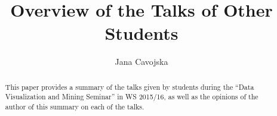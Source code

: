 \documentclass[runningheads,a4paper]{llncs}
\begin{document}


\title{Overview of the Talks of Other Students}

\author{Jana Cavojska}

%
\iffalse
\author{Firstname Lastname\inst{1} \and Firstname Lastname\inst{2} }

\institute{
Insitute 1\\
\email{...}\and
Insitute 2\\
\email{...}
}
\fi
			
\maketitle

\begin{abstract}
This paper provides a summary of the talks given by students during the ``Data Visualization and Mining Seminar'' in WS 2015/16, as well as the opinions of the author of this summary on each of the talks.
\end{abstract}
\end{document}
